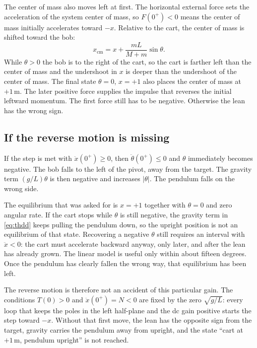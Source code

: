 \documentclass[12pt,a4paper]{article}
\begin{document}
The center of mass also moves left at first.
The horizontal external force sets the acceleration of the system center of mass, so \(F(0^+)<0\) means the center of mass initially accelerates toward \(-x\).
Relative to the cart, the center of mass is shifted toward the bob:
\[
  x_{\mathrm{cm}}=x+\frac{mL}{M+m}\sin\theta.
\]
While \(\theta>0\) the bob is to the right of the cart, so the cart is farther left than the center of mass and the undershoot in \(x\) is deeper than the undershoot of the center of mass.
The final state \(\theta=0\), \(x=+1\) also places the center of mass at \(+1\,\mathrm{m}\).
The later positive force supplies the impulse that reverses the initial leftward momentum.
The first force still has to be negative. Otherwise the lean has the wrong sign.

\subsection{If the reverse motion is missing}

If the step is met with \(\ddot x(0^+)\ge 0\), then \(\ddot\theta(0^+)\le 0\) and \(\theta\) immediately becomes negative.
The bob falls to the left of the pivot, away from the target.
The gravity term \((g/L)\theta\) is then negative and increases \(|\theta|\). The pendulum falls on the wrong side.

The equilibrium that was asked for is \(x=+1\) together with \(\theta=0\) and zero angular rate.
If the cart stops while \(\theta\) is still negative, the gravity term in \eqref{eq:thdd} keeps pulling the pendulum down, so the upright position is not an equilibrium of that state.
Recovering a negative \(\theta\) still requires an interval with \(\ddot x<0\): the cart must accelerate backward anyway, only later, and after the lean has already grown.
The linear model is useful only within about fifteen degrees. Once the pendulum has clearly fallen the wrong way, that equilibrium has been left.

The reverse motion is therefore not an accident of this particular gain.
The conditions \(T(0)>0\) and \(\ddot x(0^+)=N<0\) are fixed by the zero \(\sqrt{g/L}\):
every loop that keeps the poles in the left half-plane and the dc gain positive starts the step toward \(-x\).
Without that first move, the lean has the opposite sign from the target, gravity carries the pendulum away from upright, and the state ``cart at \(+1\,\mathrm{m}\), pendulum upright'' is not reached.
\end{document}

